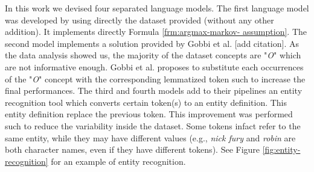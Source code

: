 \documentclass[11pt,a4paper]{article}
\begin{document}
In this work we devised four separated language models. 
The first language model was developed by using directly 
the dataset provided (without any other addition). It 
implements directly Formula \ref{frm:argmax-markov-
assumption}. The second model implements a solution 
provided by Gobbi et al. [add citation]. As the data 
analysis showed us, the majority of the dataset concepts 
are "\textit{O}" which are not informative enough. Gobbi 
et al. proposes to substitute each occurrences of the 
"\textit{O}" concept with the corresponding lemmatized 
token such to increase the final performances. 
The third and fourth models add to their pipelines an 
entity recognition tool which converts certain token(s) 
to an entity definition. This entity definition replace 
the previous token. This improvement was performed such to reduce the variability inside the dataset. 
Some tokens infact refer to the same entity, while they may have different values (e.g., \textit{nick fury} and \textit{robin} are both character names, even if they have different tokens). See Figure \ref{fig:entity-recognition} for an example of entity recognition.
\end{document}
